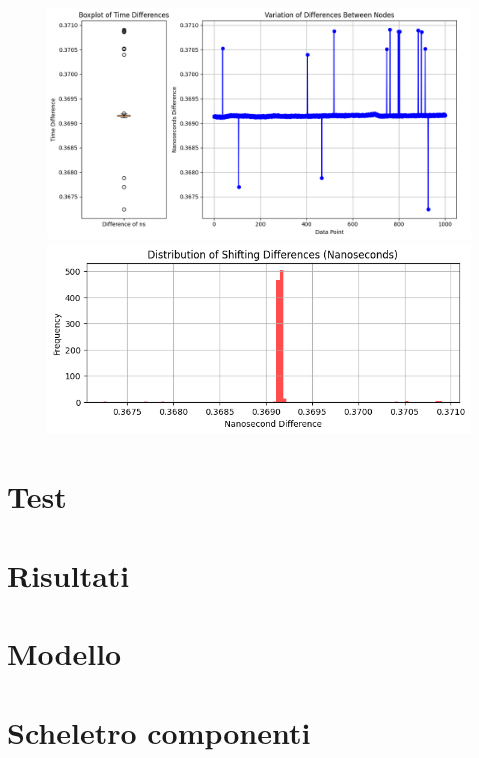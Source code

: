 \begin{figure}
    \centering
    \includegraphics[width=\textwidth]{./results/time_sync_node.png}
    \includegraphics[width=\textwidth]{./results/time_sync_distribution.png}
\end{figure}

\section{Test}

\section{Risultati}

\section{Modello}

\section{Scheletro componenti}